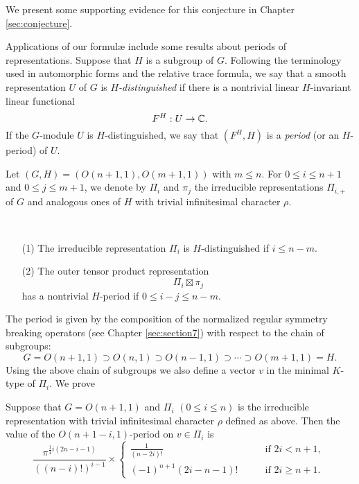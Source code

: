 \medskip \noindent
We present some supporting evidence for this conjecture
 in Chapter \ref{sec:conjecture}.

\bigskip

Applications of our formul{\ae} include
 some results about periods of representations.  
Suppose that $H$ is a subgroup of $G$. 
Following the  terminology used in automorphic forms and the relative trace formula,
 we say that a smooth representation $U $ of $G$ is
 {\it{$H$-distinguished}} if there is a nontrivial linear $H$-invariant linear functional 
\[F^{H}:U \rightarrow {\mathbb C}. \]
If the $G$-module $U$ is $H$-distinguished,
 we say that $(F^{H}, H)$ is
 a 
 {\it{period}} (or an $H$-period) of $U$.

Let $(G,H)=(O(n+1,1),O(m+1,1))$ with $m \le n$.  
For $0 \le i \le n+1$ and $0 \le j \le m+1$, 
 we denote by $\Pi_{i}$ and $\pi_j$
 the irreducible representations $\Pi_{i,+}$ of $G$
 and analogous ones of $H$ with trivial infinitesimal character $\rho $.  



\begin{theorem} 
\
\begin{enumerate}
\item[{\rm{(1)}}]
The irreducible representation $\Pi_i $ is $H$-distinguished if $i \le n-m$.  
\item[{\rm{(2)}}]
The outer tensor product representation
\[ \Pi_i \boxtimes  \pi_j\]
has a nontrivial $H$-period if $0 \le i-j \le n-m$.  
\end{enumerate}
\end{theorem}

\medskip
The period is given by the composition 
 of the normalized regular symmetry breaking operators
 (see Chapter \ref{sec:section7})
 with respect to the chain
 of subgroups:  
\[
  G =O(n+1,1) \supset O(n,1) \supset O(n-1,1) \supset \cdots \supset O(m+1,1)
  =H.  
\]
Using the above chain of subgroups we also define a vector $v$ in the 
\index{B}{minimalKtype@minimal $K$-type}
minimal $K$-type of $\Pi_i$.  
We prove 
\begin{theorem}
\label{thm:intro-period2}
Suppose that $G= O(n+1,1)$ and $\Pi_i$ $(0 \le i \le n)$ is the irreducible representation
 with trivial infinitesimal character $\rho$
 defined as above.
Then the value of the $O(n+1-i,1)$-period on $v \in \Pi_i$ is
\[
  \frac{\pi^{\frac 1 4 i(2n-i-1)}}{((n-i)!)^{i-1}}
\times
\begin{cases}
\frac 1 {(n-2i)!}
\qquad
&\text{if $2i < n+1$, }
\\
(-1)^{n+1} (2i-n-1)!
\qquad
&\text{if $2i \ge n+1$.  }
\end{cases}
\]
\end{theorem} 

